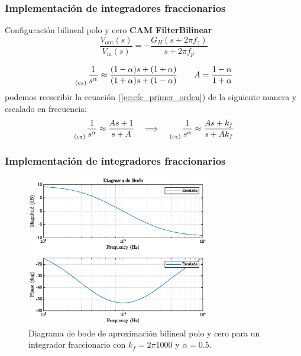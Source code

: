 \documentclass[10pt]{beamer}
\begin{document}
	\begin{frame}
		\frametitle{Implementación de integradores fraccionarios}
		\begin{block}{Configuración bilineal polo y cero}
		\textbf{CAM FilterBilinear}
			\begin{equation}
		\frac{V_{\mathrm{out}} (s)}{V_{\mathrm{in}}(s)} = -\frac{G_{H} (s + 2 \pi f_{z})}{s + 2 \pi f_{p}}
		\label{ec:CAM_bilineal}
	\end{equation}
	
	\begin{equation}
		\genfrac{}{}{0pt}{0}{}{_{(c_{2})}} \frac{1}{s^{\alpha}} \approx \frac{(1 - \alpha)s + (1 + \alpha) }{(1 + \alpha)s + (1 - \alpha)} \qquad A = \frac{1 - \alpha}{1 + \alpha}
		\label{ec:cfe_primer_orden}
	\end{equation}
	podemos reescribir la ecuación (\ref{ec:cfe_primer_orden}) de la siguiente manera y escalado en frecuencia:
	\begin{equation}
		\genfrac{}{}{0pt}{0}{}{_{(c_{2})}} \frac{1}{s^{\alpha}} \approx \frac{A s + 1}{s + A}\quad \Longrightarrow \quad \genfrac{}{}{0pt}{0}{}{_{(c_{2})}} \frac{1}{s^{\alpha}} \approx \frac{A s + k_{f}}{s + A k_{f}}
		\label{ec:cfe_primer_orden_simp}
	\end{equation}
		\end{block}
	\end{frame}
	\begin{frame}
		\frametitle{Implementación de integradores fraccionarios}
		\begin{figure}[hbtp]
		\caption{Diagrama de bode de aproximación bilineal polo y cero para un integrador fraccionario con $k_{f} = 2\pi 1000$ y  $\alpha = 0.5$.} 
		\label{fig:F12_bode_1er_orden_escalado}
		\centering
		\includegraphics[width=8cm]{../imagenes/F12_bode_1er_orden_escalado.eps}
	\end{figure}
	\end{frame}
\end{document}

